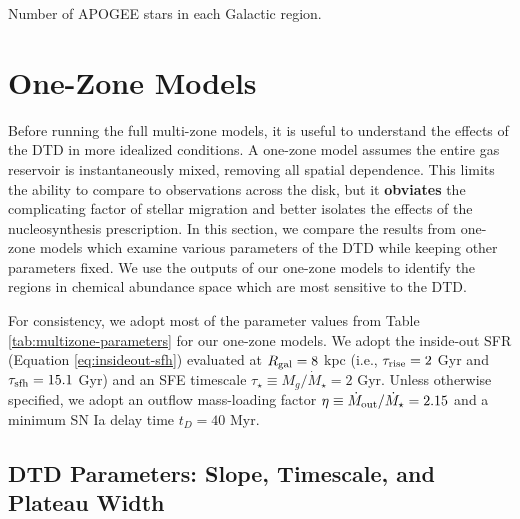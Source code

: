 \documentclass[twocolumn,twocolappendix,linenumbers]{aastex631}
\begin{document}
\begin{table*}
\centering
\caption{Number of APOGEE stars in each Galactic region.}
\label{tab:apogee-regions}
\end{table*}

\section{One-Zone Models}
\label{sec:onezone-results}

Before running the full multi-zone models, it is useful to understand the effects of the DTD in more idealized conditions. A one-zone model assumes the entire gas reservoir is instantaneously mixed, removing all spatial dependence. This limits the ability to compare to observations across the disk, but it {\bf obviates} the complicating factor of stellar migration and better isolates the effects of the nucleosynthesis prescription. In this section, we compare the results from one-zone models which examine various parameters of the DTD while keeping other parameters fixed. We use the outputs of our one-zone models to identify the regions in chemical abundance space which are most sensitive to the DTD.

For consistency, we adopt most of the parameter values from Table \ref{tab:multizone-parameters} for our one-zone models.
We adopt the inside-out SFR (Equation \ref{eq:insideout-sfh}) evaluated at $R_{\rm gal}=8$ kpc (i.e., $\tau_{\rm rise}=2$ Gyr and $\tau_{\rm sfh}=15.1$ Gyr) and an SFE timescale $\tau_\star\equiv M_g/\dot M_\star=2$ Gyr. Unless otherwise specified, we adopt an outflow mass-loading factor $\eta\equiv \dot M_{\rm out}/\dot M_\star=2.15$  and a minimum SN Ia delay time $t_D=40$ Myr. 

\subsection{\bf DTD Parameters: Slope, Timescale, and Plateau Width}
\label{sec:onezone-dtd-params}
\end{document}
